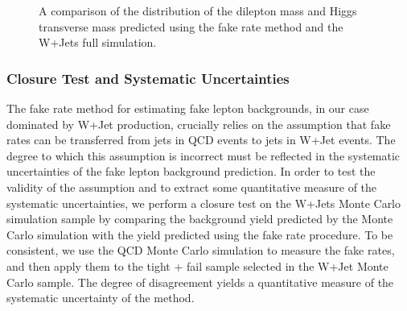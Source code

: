 \begin{figure}[!htbp]
\begin{center}
\caption{A comparison of the distribution of the dilepton mass and Higgs transverse mass 
predicted using the fake rate method and the W+Jets full simulation.}
\label{fig:FakeBkgDataDistribution_DileptonMassAndMtHiggs}
\end{center}
\end{figure}



\subsubsection{Closure Test and Systematic Uncertainties}
\label{sec:fakerateSystematics}

The fake rate method for estimating fake lepton backgrounds, in our case
dominated by W+Jet production, crucially relies on the assumption that
fake rates can be transferred from jets in QCD events to jets in W+Jet
events. The degree to which this assumption is incorrect must be 
reflected in the systematic uncertainties of the fake lepton 
background prediction. In order to test the validity of the assumption
and to extract some quantitative measure of the systematic uncertainties,
we perform a closure test on the W+Jets Monte Carlo simulation sample by 
comparing the background yield predicted by the Monte Carlo simulation
with the yield predicted using the fake rate procedure. To be consistent,
we use the QCD Monte Carlo simulation to measure the fake rates, and then
apply them to the tight + fail sample selected in the W+Jet Monte Carlo
sample. The degree of disagreement yields a quantitative measure of the 
systematic uncertainty of the method. 

